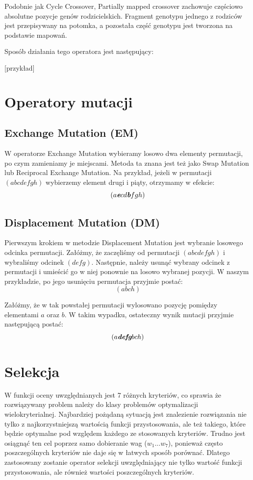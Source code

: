 \documentclass[brudnopis]{xmgr}
\begin{document}
Podobnie jak Cycle Crossover, Partially mapped crossover zachowuje częściowo absolutne pozycje genów rodzicielskich. Fragment genotypu jednego z rodziców jest przepisywany na potomka, a pozostała część genotypu jest tworzona na podstawie mapowań.

Sposób działania tego operatora jest następujący:

[przykład]


\section{Operatory mutacji}

\subsection{Exchange Mutation (EM)}

W operatorze Exchange Mutation wybieramy losowo dwa elementy permutacji, po czym zamieniamy je miejscami. Metoda ta znana jest też jako Swap Mutation lub Reciprocal Exchange Mutation. Na przykład, jeżeli w permutacji $ (a b c d e f g h) $ wybierzemy element drugi i piąty, otrzymamy w efekcie:
$$ (a \textit{\textbf{e}} c d \textit{\textbf{b}} f g h) $$

\subsection{Displacement Mutation (DM)}

Pierwszym krokiem w metodzie Displacement Mutation jest wybranie losowego odcinka permutacji. Załóżmy, że zaczęliśmy od permutacji $ (a b c d e f g h) $ i wybraliśmy odcinek $ (d e f g) $. Następnie, należy usunąć wybrany odcinek z permutacji i umieścić go w niej ponownie na losowo wybranej pozycji. W naszym przykładzie, po jego usunięciu permutacja przyjmie postać:
$$ (a b c h) $$

Załóżmy, że w tak powstałej permutacji wylosowano pozycję pomiędzy elementami $a$ oraz $b$. W takim wypadku, ostateczny wynik mutacji przyjmie następującą postać:
$$ (a \textit{\textbf{defg}} b c h) $$


\section{Selekcja}

W funkcji oceny uwzględnianych jest 7 różnych kryteriów, co sprawia że rozwiązywany problem należy do klasy problemów optymalizacji wielokryterialnej. Najbardziej pożądaną sytuacją jest znalezienie rozwiązania nie tylko z najkorzystniejszą wartością funkcji przystosowania, ale też takiego, które będzie optymalne pod względem każdego ze stosowanych kryteriów. Trudno jest osiągnąć ten cel poprzez samo dobieranie wag ($w_1 ... w_7$), ponieważ często poszczególnych kryteriów nie daje się w łatwych sposób porównać. Dlatego zastosowany zostanie operator selekcji uwzględniający nie tylko wartość funkcji przystosowania, ale również wartości poszczególnych kryteriów.
\end{document}
